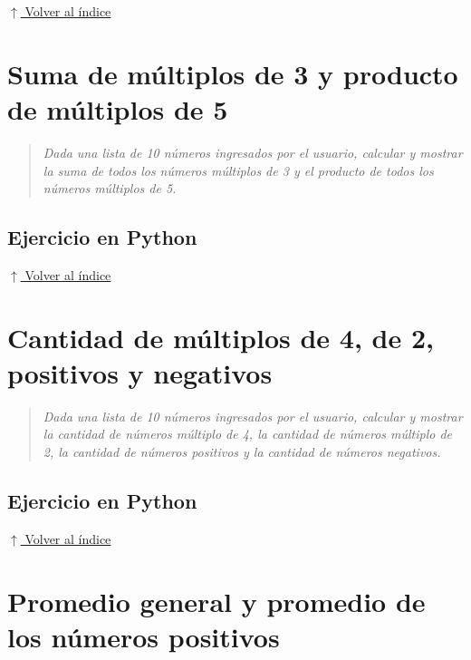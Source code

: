 \documentclass[12pt]{article}
\newcommand{\codigopython}[2]{%
}
\newcommand{\volverindice}{%
    \vspace{1em}%
    \begin{flushright}%
        \hyperlink{indice}{\small $\uparrow$ Volver al índice}%
    \end{flushright}%
}
\newcommand{\enunciado}[1]{%
    \begin{quote}
        \itshape #1
    \end{quote}
}
\begin{document}
\codigopython{24}{Suma de pares y producto de impares en una lista de 10 números}

\volverindice
\newpage


\section{Suma de múltiplos de 3 y producto de múltiplos de 5}

\enunciado{Dada una lista de 10 números ingresados por el usuario, calcular y mostrar la suma de todos los números múltiplos de 3 y el producto de todos los números múltiplos de 5.}

\subsection*{Ejercicio en Python}

\codigopython{25}{Suma de múltiplos de 3 y producto de múltiplos de 5}

\volverindice
\newpage


\section{Cantidad de múltiplos de 4, de 2, positivos y negativos}

\enunciado{Dada una lista de 10 números ingresados por el usuario, calcular y mostrar la cantidad de números múltiplo de 4, la cantidad de números múltiplo de 2, la cantidad de números positivos y la cantidad de números negativos.}

\subsection*{Ejercicio en Python}

\codigopython{26}{Cantidad de múltiplos de 4, de 2, positivos y negativos}

\volverindice
\newpage


\section{Promedio general y promedio de los números positivos}
\end{document}
